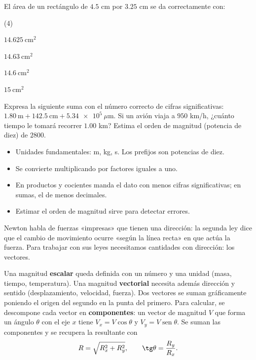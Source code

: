 \documentclass[11pt]{article}
\begin{document}
\begin{preguntas}
\pregunta El área de un rectángulo de $\num{4,5}$ cm por $\num{3,25}$ cm se da correctamente
con:
\begin{opciones*}(4)
  \item $\num{14,625}\ \mathrm{cm^2}$
  \item $\num{14,63}\ \mathrm{cm^2}$
  \item $\num{14,6}\ \mathrm{cm^2}$
  \item $15\ \mathrm{cm^2}$
\end{opciones*}
\pregunta Expresa la siguiente suma con el número correcto de cifras significativas:
$\num{1,80}\ \text{m} + \num{142,5}\ \text{cm} + \num{5,34e5}\ \mu\text{m}$.
\espacio{2.5cm}
\pregunta Si un avión viaja a $950$ km/h, ¿cuánto tiempo le tomará recorrer $\num{1,00}$ km?
\espacio{2cm}
\pregunta Estima el orden de magnitud (potencia de diez) de $2800$.
\espacio{1cm}
\end{preguntas}

\begin{resumen}
\begin{itemize}
  \item Unidades fundamentales: m, kg, s. Los prefijos son potencias de diez.
  \item Se convierte multiplicando por factores iguales a uno.
  \item En productos y cocientes manda el dato con menos cifras significativas; en sumas, el
        de menos decimales.
  \item Estimar el orden de magnitud sirve para detectar errores.
\end{itemize}
\end{resumen}

\label{tema:vectores}

\begin{hilo}
Newton habla de fuerzas «impresas» que tienen una dirección: la segunda ley dice que el cambio
de movimiento ocurre «según la línea recta» en que actúa la fuerza. Para trabajar con sus
leyes necesitamos cantidades con dirección: los vectores.
\end{hilo}

Una magnitud \textbf{escalar} queda definida con un número y una unidad (masa, tiempo,
temperatura). Una magnitud \textbf{vectorial} necesita además dirección y sentido
(desplazamiento, velocidad, fuerza). Dos vectores se suman gráficamente poniendo el origen del
segundo en la punta del primero. Para calcular, se descompone cada vector en
\textbf{componentes}: un vector de magnitud $V$ que forma un ángulo $\theta$ con el eje $x$
tiene $V_x = V\cos\theta$ y $V_y = V\operatorname{sen}\theta$. Se suman las componentes y se
recupera la resultante con
\[
  R = \sqrt{R_x^2 + R_y^2}, \qquad \tg\theta = \frac{R_y}{R_x}.
\]
\end{document}
